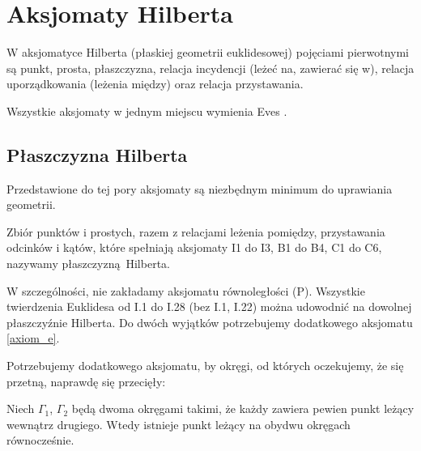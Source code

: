 %

\section{Aksjomaty Hilberta}
W aksjomatyce Hilberta (płaskiej geometrii euklidesowej) pojęciami pierwotnymi są punkt, prosta, płaszczyzna, relacja incydencji (leżeć na, zawierać się w), relacja uporządkowania (leżenia między) oraz relacja przystawania.

Wszystkie aksjomaty w jednym miejscu wymienia Eves \cite[s. 380-382]{eves1_1972}.

%

%

%

%

%


%

\subsection{Płaszczyzna Hilberta}

Przedstawione do tej pory aksjomaty są niezbędnym minimum do uprawiania geometrii.

\begin{definition}
    Zbiór punktów i prostych, razem z relacjami leżenia pomiędzy, przystawania odcinków i kątów, które spełniają aksjomaty I1 do I3, B1 do B4, C1 do C6, nazywamy płaszczyzną Hilberta.
\end{definition}

W szczególności, nie zakładamy aksjomatu równoległości (P).
Wszystkie twierdzenia Euklidesa od I.1 do I.28 (bez I.1, I.22) można udowodnić na dowolnej płaszczyźnie Hilberta.
Do dwóch wyjątków potrzebujemy dodatkowego aksjomatu \ref{axiom_e}.
%

Potrzebujemy dodatkowego aksjomatu, by okręgi, od których oczekujemy, że się przetną, naprawdę się przecięły:

\begin{axiom}
    \label{axiom_e}
    Niech $\Gamma_1$, $\Gamma_2$ będą dwoma okręgami takimi, że każdy zawiera pewien punkt leżący wewnątrz drugiego.
    Wtedy istnieje punkt leżący na obydwu okręgach równocześnie.
\end{axiom}

